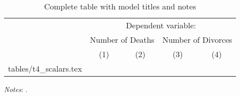\documentclass{article}
\makeatletter
\newcommand\primitiveinput[1]
{\@@input #1 }
\makeatother
\begin{document}
\begin{table}[H]
	\centering
	\label{tab:Table}
	\begin{adjustbox}{max width=\linewidth}
		\begin{threeparttable}
			\caption{Complete table with model titles and notes}
			\begin{tabular}{@{}l*{4}{c}@{}}
                \toprule
                \toprule 
                &\multicolumn{4}{c}{Dependent variable:} \\
                \cmidrule(lr){2-5} 
                &\multicolumn{2}{c}{Number of Deaths} & \multicolumn{2}{c}{Number of Divorces}  \\ 
                \cmidrule(r){2-3}
                \cmidrule(l){4-5}  
                & (1) & (2) & (3) & (4) \\
                \primitiveinput{tables/t4_scalars.tex}
                \bottomrule
			\end{tabular}
			\begin{tablenotes}
				\setlength{}
				\footnotesize
				\item \textit{Notes}: \lipsum[1].
			\end{tablenotes}
		\end{threeparttable}
	\end{adjustbox}
\end{table}
\end{document}

